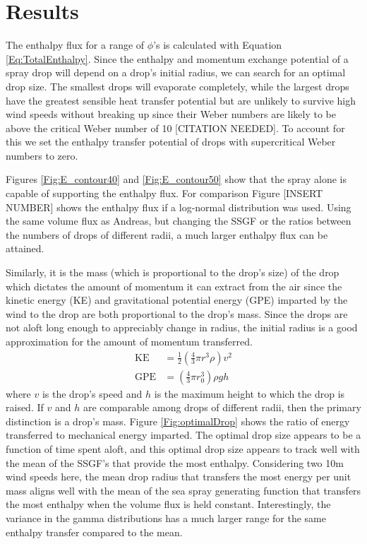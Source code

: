 \documentclass[17pt,a4paper]{article}
\begin{document}
\section{Results}
The enthalpy flux for a range of $\phi$'s is calculated with Equation \ref{Eq:TotalEnthalpy}. Since the enthalpy and momentum exchange potential of a spray drop will depend on a drop's initial radius, we can search for an optimal drop size. The smallest drops will evaporate completely, while the largest drops have the greatest sensible heat transfer potential but are unlikely to survive high wind speeds without breaking up since their Weber numbers are likely to be above the critical Weber number of 10 [CITATION NEEDED]. To account for this we set the enthalpy transfer potential of drops with supercritical Weber numbers to zero. \par
Figures \ref{Fig:E_contour40} and \ref{Fig:E_contour50} show that the spray alone is capable of supporting the enthalpy flux. For comparison Figure [INSERT NUMBER] shows the enthalpy flux if a log-normal distribution was used. 
Using the same volume flux as Andreas, but changing the SSGF or the ratios between the numbers of drops of different radii, a much larger enthalpy flux can be attained. \par 
Similarly, it is the mass (which is proportional to the drop's size) of the drop which dictates the amount of momentum it can extract from the air since the kinetic energy (KE) and gravitational potential energy (GPE) imparted by the wind to the drop are both proportional to the drop's mass. Since the drops are not aloft long enough to appreciably change in radius, the initial radius is a good approximation for the amount of momentum transferred.
\begin{align}
\text{KE} &= \frac{1}{2}\left(\frac{4}{3}\pi r^3 \rho\right)v^2\\
\text{GPE} &= \left(\frac{4}{3}\pi r_0^3 \right)\rho g h
\end{align}
where $v$ is the drop's speed and $h$ is the maximum height to which the drop is raised.
If $v$ and $h$ are comparable among drops of different radii, then the primary distinction is a drop's mass. Figure \ref{Fig:optimalDrop} shows the ratio of energy transferred to mechanical energy imparted. The optimal drop size appears to be a function of time spent aloft, and this optimal drop size appears to track well with the mean of the SSGF's that provide the most enthalpy. Considering two 10m wind speeds here, the mean drop radius that transfers the most energy per unit mass aligns well with the mean of the sea spray generating function that transfers the most enthalpy when the volume flux is held constant. Interestingly, the variance in the gamma distributions has a much larger range for the same enthalpy transfer compared to the mean.
\end{document}
